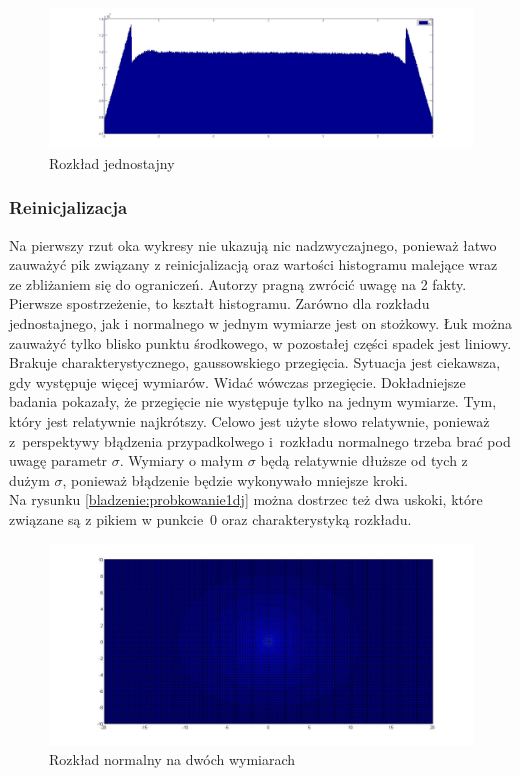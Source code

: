 \documentclass{mini}
\begin{document}
\begin{figure}[H]
\centering
\includegraphics[width=\textwidth]{p_j_100M_1__3_3}
\caption{Rozkład jednostajny}
\label{bladzenie:rzutowanie1dj}
\end{figure}

\subsubsection*{Reinicjalizacja}
Na pierwszy rzut oka wykresy nie ukazują nic nadzwyczajnego, ponieważ łatwo zauważyć pik związany z reinicjalizacją oraz wartości histogramu malejące wraz ze zbliżaniem się do ograniczeń. Autorzy pragną zwrócić uwagę na 2 fakty.\\
Pierwsze spostrzeżenie, to kształt histogramu. Zarówno dla rozkładu jednostajnego, jak i normalnego w jednym wymiarze jest on stożkowy. Łuk można zauważyć tylko blisko punktu środkowego, w pozostałej części spadek jest liniowy. Brakuje charakterystycznego, gaussowskiego przegięcia. Sytuacja jest ciekawsza, gdy występuje więcej wymiarów. Widać wówczas przegięcie. Dokładniejsze badania pokazały, że przegięcie nie występuje tylko na jednym wymiarze. Tym, który jest relatywnie najkrótszy. Celowo jest użyte słowo relatywnie, ponieważ z~perspektywy błądzenia przypadkolwego i~rozkładu normalnego trzeba brać pod uwagę parametr $\sigma$. Wymiary o małym $\sigma$ będą relatywnie dłuższe od tych z dużym $\sigma$, ponieważ błądzenie będzie wykonywało mniejsze kroki.\\
Na rysunku \ref{bladzenie:probkowanie1dj} można dostrzec też dwa uskoki, które związane są z pikiem w punkcie~$0$ oraz charakterystyką rozkładu.

\begin{figure}[H]
\centering
\includegraphics[width=\textwidth]{ri_n_10M_2__20_20__10_10_4}
\caption{Rozkład normalny na dwóch wymiarach}
\end{figure}
\end{document}
